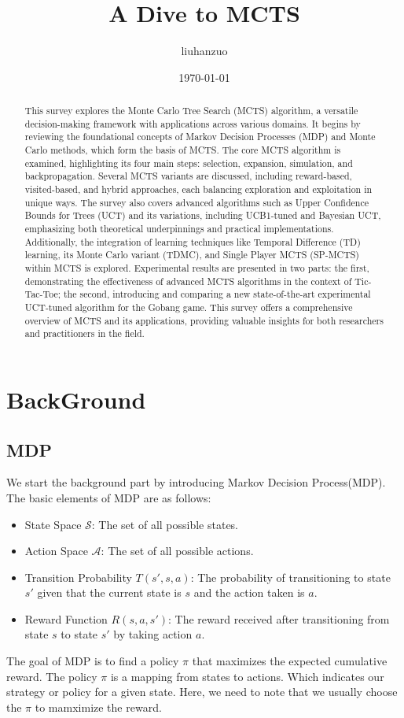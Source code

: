 \documentclass[11pt]{article}
\theoremstyle{definitionstyle}
\begin{document}
\title{A Dive to MCTS}
\author{liuhanzuo}
\date{\today}
\maketitle
\begin{abstract}
This survey explores the Monte Carlo Tree Search (MCTS) algorithm, a versatile decision-making framework with applications across various domains. It begins by reviewing the foundational concepts of Markov Decision Processes (MDP) and Monte Carlo methods, which form the basis of MCTS. The core MCTS algorithm is examined, highlighting its four main steps: selection, expansion, simulation, and backpropagation. Several MCTS variants are discussed, including reward-based, visited-based, and hybrid approaches, each balancing exploration and exploitation in unique ways. The survey also covers advanced algorithms such as Upper Confidence Bounds for Trees (UCT) and its variations, including UCB1-tuned and Bayesian UCT, emphasizing both theoretical underpinnings and practical implementations. Additionally, the integration of learning techniques like Temporal Difference (TD) learning, its Monte Carlo variant (TDMC), and Single Player MCTS (SP-MCTS) within MCTS is explored. Experimental results are presented in two parts: the first, demonstrating the effectiveness of advanced MCTS algorithms in the context of Tic-Tac-Toe; the second, introducing and comparing a new state-of-the-art experimental UCT-tuned algorithm for the Gobang game. This survey offers a comprehensive overview of MCTS and its applications, providing valuable insights for both researchers and practitioners in the field.
\end{abstract}
\section{BackGround}
\subsection{MDP}
We start the background part by introducing Markov Decision Process(MDP). The basic elements of MDP are as follows:
\begin{itemize}
    \item State Space $\mathcal{S}$: The set of all possible states.
    \item Action Space $\mathcal{A}$: The set of all possible actions.
    \item Transition Probability $T(s',s,a)$: The probability of transitioning to state $s'$ given that the current state is $s$ and the action taken is $a$.
    \item Reward Function $R(s,a,s')$: The reward received after transitioning from state $s$ to state $s'$ by taking action $a$.
\end{itemize}
The goal of MDP is to find a policy $\pi$ that maximizes the expected cumulative reward. The policy $\pi$ is a mapping from states to actions. Which indicates our strategy or policy for a given state. Here, we need to note that we usually choose the $\pi$ to mamximize the reward.
\end{document}
